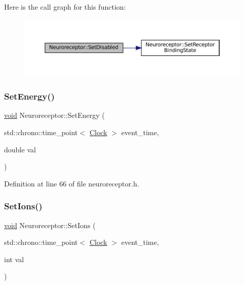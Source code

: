 Here is the call graph for this function\+:\nopagebreak
\begin{figure}[H]
\begin{center}
\leavevmode
\includegraphics[width=350pt]{class_neuroreceptor_aeec8bb2442e04700d4e9d80bb2d6e47e_cgraph}
\end{center}
\end{figure}
\mbox{\label{class_neuroreceptor_ac1189f9c40e3cd07e4b1dc11115ad882}} 
\subsubsection{\texorpdfstring{Set\+Energy()}{SetEnergy()}}
{\footnotesize\ttfamily \mbox{\hyperlink{glad_8h_a950fc91edb4504f62f1c577bf4727c29}{void}} Neuroreceptor\+::\+Set\+Energy (\begin{DoxyParamCaption}\item[{std\+::chrono\+::time\+\_\+point$<$ \mbox{\hyperlink{universe_8h_a0ef8d951d1ca5ab3cfaf7ab4c7a6fd80}{Clock}} $>$}]{event\+\_\+time,  }\item[{double}]{val }\end{DoxyParamCaption})\hspace{0.3cm}{\ttfamily [inline]}}



Definition at line 66 of file neuroreceptor.\+h.

\mbox{\label{class_neuroreceptor_a36a548475e752631130a2b4ec67c66b6}} 
\subsubsection{\texorpdfstring{Set\+Ions()}{SetIons()}}
{\footnotesize\ttfamily \mbox{\hyperlink{glad_8h_a950fc91edb4504f62f1c577bf4727c29}{void}} Neuroreceptor\+::\+Set\+Ions (\begin{DoxyParamCaption}\item[{std\+::chrono\+::time\+\_\+point$<$ \mbox{\hyperlink{universe_8h_a0ef8d951d1ca5ab3cfaf7ab4c7a6fd80}{Clock}} $>$}]{event\+\_\+time,  }\item[{int}]{val }\end{DoxyParamCaption})\hspace{0.3cm}{\ttfamily [inline]}}



